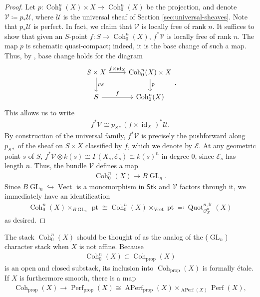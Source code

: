 \documentclass{article}
\numberwithin{equation}{section}
\theoremstyle{quest}
\theoremstyle{definition}
\theoremstyle{remark}
\DeclareMathOperator{\GL}{GL}
\DeclareMathOperator{\id}{id}
\DeclareMathOperator{\pt}{pt}
\DeclareMathOperator{\Coh}{Coh}
\DeclareMathOperator{\Quot}{Quot}
\DeclareMathOperator{\Perf}{Perf}
\DeclareMathOperator{\APerf}{APerf}
\DeclareMathOperator{\Vect}{Vect}
\begin{document}
\begin{proof}
	Let $p:\Coh^n_0(X)\times X\to \Coh^n_0(X)$ be the projection, and denote $\mathscr{V}\coloneqq p_*\mathscr{U}$, where $\mathscr{U}$ is the universal sheaf of Section \ref{sec:universal-sheaves}. Note that $p_*\mathscr{U}$ is perfect. In fact, we claim that $\mathscr{V}$ is locally free of rank $n$. It suffices to show that given an $S$-point $f:S\to \Coh^n_0(X)$, $f^*\mathscr{V}$ is locally free of rank $n$. The map $p$ is schematic quasi-compact; indeed, it is the base change of such a map. Thus, by \cite[Chapter 3 Proposition 2.2.2]{GR}, base change holds for the diagram
	\[
	\begin{tikzcd}
		S\times X\arrow[r,"f\times \id_X"]\arrow[d,"p_S"]&\Coh^n_0(X)\times X\arrow[d,"p"]\\
		S\arrow[r,"f"]&\Coh^n_0(X)
	\end{tikzcd}.
	\] 
This allows us to write
\begin{align*}
	f^*\mathscr{V}\cong p_{S*}(f\times \id_X)^*\mathscr{U}.
\end{align*} 
By construction of the universal family, $f^*\mathscr{V}$ is precisely the pushforward along $p_{S*}$ of the sheaf on $S\times X$ classified by $f$, which we denote by $\mathscr{E}$. At any geometric point $s$ of $S$, $f^*\mathscr{V}\otimes k(s)\cong\Gamma(X_s,\mathscr{E}_s)\cong k(s)^n$ in degree 0, since $\mathscr{E}_s$ has length $n$. Thus, the bundle $\mathscr{V}$ defines a map
\begin{align*}
	\Coh^n_0(X)\to B\GL_n.
\end{align*} 
Since $B\GL_n\hookrightarrow \Vect$ is a monomorphism in $\mathsf{Stk}$ and $\mathscr{V}$ factors through it, we immediately have an identification
\begin{align*}
	\Coh^n_0(X)\times _{B\GL_n}\pt\cong\Coh^n_0(X)\times _{\Vect}\pt\eqcolon \Quot^{n,\text{fr}}_{\mathscr{O}_X^n}(X)
\end{align*} 
as desired.
\end{proof} 
The stack $\Coh^n_0(X)$ should be thought of as the analog of the ($\GL_n$) character stack when $X$ is not affine. Because
\begin{align*}
	\Coh^n_0(X)\subset \Coh_{\text{prop}}(X)
\end{align*} 
is an open and closed substack, its inclusion into $\Coh_{\text{prop}}(X)$ is formally \'etale. If $X$ is furthermore smooth, there is a map
\begin{align*}
	\Coh_{\text{prop}}(X)\to \Perf_{\text{prop}}(X) \cong \APerf_{\text{prop}}(X)\times _{\APerf(X)}\Perf(X),
\end{align*} 
\end{document}
